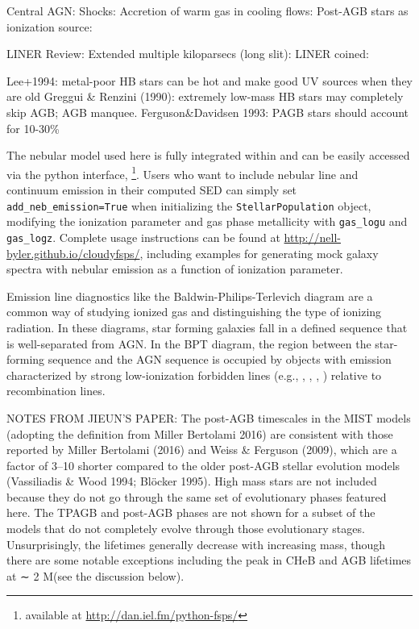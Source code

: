 Central AGN: \citet{Ferland+1983, Halpern+1983, Ho+1999, Kewley+2006, Ho+2009}
Shocks: \citet{Koski+1976, Dopita+1995, Allen+2008}
Accretion of warm gas in cooling flows: \citet{Heckman+1981}
Post-AGB stars as ionization source: \citet{Binette+1994, Taniguchi+2000}

LINER Review: \citet{Filippenko+2003}
Extended multiple kiloparsecs (long slit): \citet{Goudfrooij+1994, Maccehetto+1996}
LINER coined: \citet{Heckman+1980}

Lee+1994: metal-poor HB stars can be hot and make good UV sources when they are old
Greggui & Renzini (1990): extremely low-mass HB stars may completely skip AGB; AGB manquee.
Ferguson&Davidsen 1993: PAGB stars should account for 10-30\%


The nebular model used here is fully integrated within \FSPS and can be easily accessed via the python interface, \pFSPS\footnote{available at \url{http://dan.iel.fm/python-fsps/}}. Users who want to include nebular line and continuum emission in their computed SED can simply set {\tt add\_neb\_emission=True} when initializing the {\tt StellarPopulation} object, modifying the ionization parameter and gas phase metallicity with {\tt gas\_logu} and {\tt gas\_logz}. Complete usage instructions can be found at \url{http://nell-byler.github.io/cloudyfsps/}, including examples for generating mock galaxy spectra with nebular emission as a function of ionization parameter.

Emission line diagnostics like the Baldwin-Philips-Terlevich diagram \citep[BPT; ][]{BPT} are a common way of studying ionized gas and distinguishing the type of ionizing radiation. In these diagrams, star forming galaxies fall in a defined sequence that is well-separated from AGN. In the BPT diagram, the region between the star-forming sequence and the AGN sequence is occupied by objects with emission characterized by strong low-ionization forbidden lines (e.g., \nii{}, \sii{}, \oii{}, \oi{}) relative to recombination lines.


NOTES FROM JIEUN'S PAPER:
The post-AGB timescales in the MIST models (adopting the definition from Miller Bertolami 2016) are consistent with those reported by Miller Bertolami (2016) and Weiss & Ferguson (2009), which are a factor of 3–10 shorter compared to the older post-AGB stellar evolution models (Vassiliadis & Wood 1994; Blöcker 1995). High mass stars are not included because they do not go through the same set of evolutionary phases featured here. The TPAGB and post-AGB phases are not shown for a subset of the models that do not completely evolve through those evolutionary stages. Unsurprisingly, the lifetimes generally decrease with increasing mass, though there are some notable exceptions including the peak in CHeB and AGB lifetimes at ∼ 2 M(see the discussion below).


